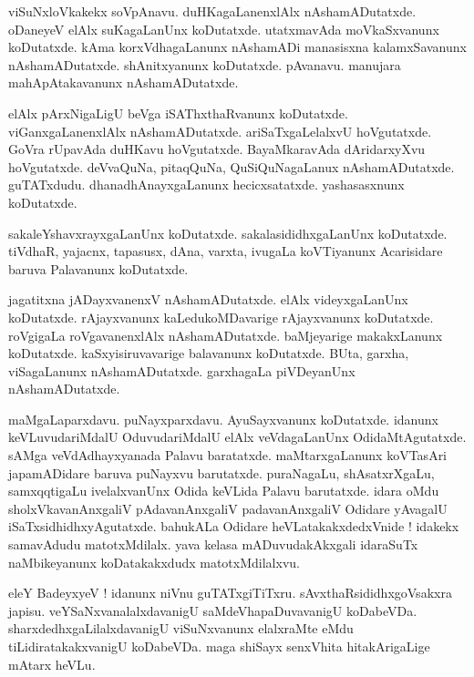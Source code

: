 \documentclass{article}
\begin{document}
\begin{mn}%
viSuNxloVkakekx soVpAnavu. duHKagaLanenxlAlx nAshamADutatxde. oDaneyeV elAlx suKagaLanUnx 
koDutatxde. utatxmavAda moVkaSxvanunx koDutatxde. kAma korxVdhagaLanunx nAshamADi manasisxna 
kalamxSavanunx nAshamADutatxde. shAnitxyanunx koDutatxde. pAvanavu. manujara mahApAtakavanunx 
nAshamADutatxde.
\end{mn}

\begin{mn}%
elAlx pArxNigaLigU beVga iSAThxthaRvanunx koDutatxde. viGanxgaLanenxlAlx nAshamADutatxde. 
ariSaTxgaLelalxvU hoVgutatxde. GoVra rUpavAda duHKavu hoVgutatxde. BayaMkaravAda dAridarxyXvu 
hoVgutatxde. deVvaQuNa, pitaqQuNa, QuSiQuNagaLanux nAshamADutatxde. guTATxdudu. 
dhanadhAnayxgaLanunx hecicxsatatxde. yashasasxnunx koDutatxde.
\end{mn}

\begin{mn}%
sakaleYshavxrayxgaLanUnx koDutatxde. sakalasididhxgaLanUnx koDutatxde. tiVdhaR, yajacnx, tapasusx, 
dAna, varxta, ivugaLa koVTiyanunx Acarisidare baruva Palavanunx koDutatxde.
\end{mn}

\begin{mn}%
jagatitxna jADayxvanenxV nAshamADutatxde. elAlx videyxgaLanUnx koDutatxde. rAjayxvanunx 
kaLedukoMDavarige rAjayxvanunx koDutatxde. roVgigaLa roVgavanenxlAlx nAshamADutatxde. baMjeyarige 
makakxLanunx koDutatxde. kaSxyisiruvavarige balavanunx koDutatxde. BUta, garxha, viSagaLanunx 
nAshamADutatxde. garxhagaLa piVDeyanUnx nAshamADutatxde.
\end{mn}

\begin{mn}%
maMgaLaparxdavu. puNayxparxdavu. AyuSayxvanunx koDutatxde. idanunx keVLuvudariMdalU OduvudariMdalU 
elAlx veVdagaLanUnx OdidaMtAgutatxde. sAMga veVdAdhayxyanada Palavu baratatxde. maMtarxgaLanunx 
koVTasAri japamADidare baruva puNayxvu barutatxde. puraNagaLu, shAsatxrXgaLu, samxqqtigaLu 
ivelalxvanUnx Odida keVLida Palavu barutatxde. idara oMdu sholxVkavanAnxgaliV pAdavanAnxgaliV 
padavanAnxgaliV Odidare yAvagalU iSaTxsidhidhxyAgutatxde. bahukALa Odidare heVLatakakxdedxVnide ! 
idakekx samavAdudu matotxMdilalx. yava kelasa mADuvudakAkxgali idaraSuTx naMbikeyanunx 
koDatakakxdudx matotxMdilalxvu.
\end{mn}

\begin{mn}%
eleY BadeyxyeV ! idanunx niVnu guTATxgiTiTxru. sAvxthaRsididhxgoVsakxra japisu. 
veYSaNxvanalalxdavanigU saMdeVhapaDuvavanigU koDabeVDa. sharxdedhxgaLilalxdavanigU viSuNxvanunx 
elalxraMte eMdu tiLidiratakakxvanigU koDabeVDa. maga shiSayx senxVhita hitakArigaLige mAtarx heVLu.
\end{mn}
\end{document}
